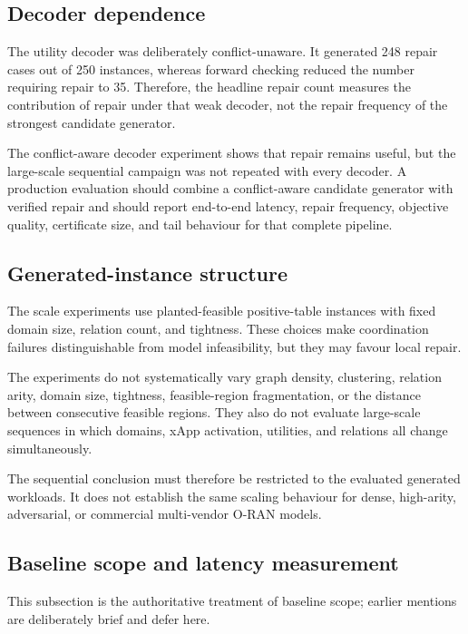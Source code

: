 \documentclass[pdflatex,sn-mathphys-num,iicol,oneside]{sn-jnl}
\begin{document}
\subsection{Decoder dependence}

The utility decoder was deliberately conflict-unaware. It generated
248 repair cases out of 250 instances, whereas forward checking
reduced the number requiring repair to 35. Therefore, the headline
repair count measures the contribution of repair under that weak
decoder, not the repair frequency of the strongest candidate generator.

The conflict-aware decoder experiment shows that repair remains useful,
but the large-scale sequential campaign was not repeated with every
decoder. A production evaluation should combine a conflict-aware
candidate generator with verified repair and should report end-to-end
latency, repair frequency, objective quality, certificate size, and
tail behaviour for that complete pipeline.

\subsection{Generated-instance structure}

The scale experiments use planted-feasible positive-table instances
with fixed domain size, relation count, and tightness. These choices
make coordination failures distinguishable from model infeasibility,
but they may favour local repair.

The experiments do not systematically vary graph density, clustering,
relation arity, domain size, tightness, feasible-region fragmentation,
or the distance between consecutive feasible regions. They also do
not evaluate large-scale sequences in which domains, xApp activation,
utilities, and relations all change simultaneously.

The sequential conclusion must therefore be restricted to the
evaluated generated workloads. It does not establish the same scaling
behaviour for dense, high-arity, adversarial, or commercial
multi-vendor O-RAN models.

\subsection{Baseline scope and latency measurement}
\label{sec:baseline-scope}

This subsection is the authoritative treatment of baseline scope;
earlier mentions are deliberately brief and defer here.
\end{document}
